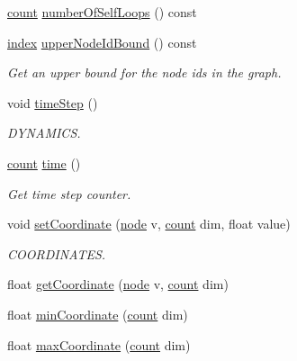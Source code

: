\begin{DoxyCompactItemize}
\hyperlink{namespace_networ_kit_a76b399edfa50ae72e4aa86007aaa800a}{count} \hyperlink{class_networ_kit_1_1_graph_a467e6959962dc4600add8832602b5353}{number\-Of\-Self\-Loops} () const 
\item 
\hyperlink{namespace_networ_kit_a486772e5516be73694ef0d780b828d04}{index} \hyperlink{class_networ_kit_1_1_graph_ac4be23441cda30b287dc51043b7a3b75}{upper\-Node\-Id\-Bound} () const 
\begin{DoxyCompactList}\small\item\em Get an upper bound for the node ids in the graph. \end{DoxyCompactList}\item 
void \hyperlink{class_networ_kit_1_1_graph_a0f575d52373afbbc626082dad5f73c79}{time\-Step} ()
\begin{DoxyCompactList}\small\item\em D\-Y\-N\-A\-M\-I\-C\-S. \end{DoxyCompactList}\item 
\hyperlink{namespace_networ_kit_a76b399edfa50ae72e4aa86007aaa800a}{count} \hyperlink{class_networ_kit_1_1_graph_ae104d2924993828f9ac99e36901ffe2e}{time} ()
\begin{DoxyCompactList}\small\item\em Get time step counter. \end{DoxyCompactList}\item 
void \hyperlink{class_networ_kit_1_1_graph_a0e2508500072aff1e8f7403895749284}{set\-Coordinate} (\hyperlink{namespace_networ_kit_a53fe3e4fd04ea024160e4d024dfebadf}{node} v, \hyperlink{namespace_networ_kit_a76b399edfa50ae72e4aa86007aaa800a}{count} dim, float value)
\begin{DoxyCompactList}\small\item\em C\-O\-O\-R\-D\-I\-N\-A\-T\-E\-S. \end{DoxyCompactList}\item 
float \hyperlink{class_networ_kit_1_1_graph_a63f71735596e579fb154ab3f657bebc9}{get\-Coordinate} (\hyperlink{namespace_networ_kit_a53fe3e4fd04ea024160e4d024dfebadf}{node} v, \hyperlink{namespace_networ_kit_a76b399edfa50ae72e4aa86007aaa800a}{count} dim)
\item 
float \hyperlink{class_networ_kit_1_1_graph_a5c0e246fc2dd93296a92dba2bca0e54c}{min\-Coordinate} (\hyperlink{namespace_networ_kit_a76b399edfa50ae72e4aa86007aaa800a}{count} dim)
\item 
float \hyperlink{class_networ_kit_1_1_graph_a2568c323b1fdee04c15343d2c695127e}{max\-Coordinate} (\hyperlink{namespace_networ_kit_a76b399edfa50ae72e4aa86007aaa800a}{count} dim)

\end{DoxyCompactItemize}
